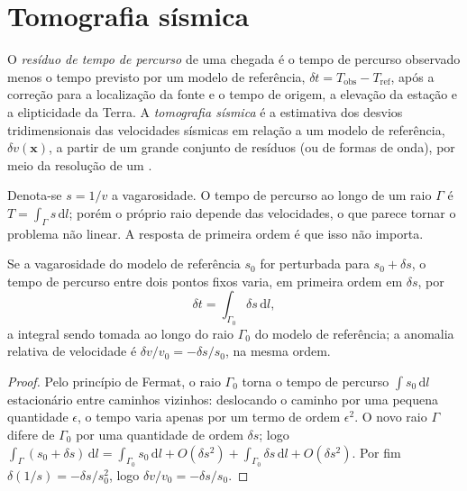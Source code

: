 \section{Tomografia sísmica}\label{sec:b3:seismology-imaging:tomography}

\begin{definition}\label{def:b3:seismology-imaging:tomography}
O \emph{resíduo de tempo de percurso} de uma chegada é o
tempo de percurso observado menos o tempo previsto por um modelo de referência,
$\delta t = T_{\text{obs}} - T_{\text{ref}}$, após a correção para a localização da fonte
e o tempo de origem, a elevação da estação e a elipticidade da Terra.
A \emph{tomografia sísmica} é a
estimativa dos desvios tridimensionais das velocidades sísmicas em relação a um
modelo de referência, $\delta v(\mathbf x)$, a partir de um grande conjunto de resíduos (ou de
formas de onda), por meio da resolução de um .
\end{definition}

Denota-se $s = 1/v$ a vagarosidade. O tempo de percurso ao longo de um raio $\Gamma$ é
$T = \int_\Gamma s\,\mathrm dl$; porém o próprio raio depende das velocidades,
o que parece tornar o problema não linear. A resposta de primeira ordem é que isso
não importa.

\begin{proposition}\label{prop:b3:seismology-imaging:linear}
Se a vagarosidade do modelo de referência $s_0$ for perturbada para $s_0 + \delta s$,
o tempo de percurso entre dois pontos fixos varia, em primeira ordem em
$\delta s$, por
\[
  \delta t = \int_{\Gamma_0}\delta s\,\mathrm dl ,
\]
a integral sendo tomada ao longo do raio $\Gamma_0$ do modelo de referência; a
anomalia relativa de velocidade é $\delta v/v_0 = -\delta s/s_0$, na mesma ordem.
\end{proposition}

\begin{proof}
Pelo princípio de Fermat, o raio $\Gamma_0$ torna o tempo de percurso
$\int s_0\,\mathrm dl$ estacionário entre caminhos vizinhos: deslocando o caminho por uma
pequena quantidade $\epsilon$, o tempo varia apenas por um termo de ordem $\epsilon^2$.
O novo raio $\Gamma$ difere de $\Gamma_0$ por uma quantidade de ordem $\delta s$;
logo $\int_\Gamma(s_0 + \delta s)\,\mathrm dl = \int_{\Gamma_0}s_0\,\mathrm dl +
O(\delta s^2) + \int_{\Gamma_0}\delta s\,\mathrm dl + O(\delta s^2)$. Por fim
$\delta(1/s) = -\delta s/s_0^2$, logo $\delta v/v_0 = -\delta s/s_0$.
\end{proof}

